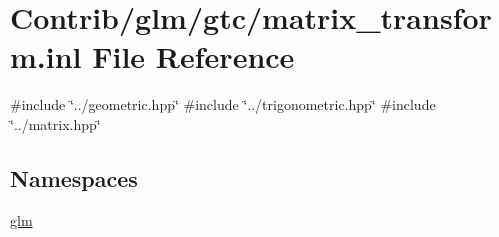\hypertarget{matrix__transform_8inl}{}\section{Contrib/glm/gtc/matrix\+\_\+transform.inl File Reference}
\label{matrix__transform_8inl}
{\ttfamily \#include \char`\"{}../geometric.\+hpp\char`\"{}}\newline
{\ttfamily \#include \char`\"{}../trigonometric.\+hpp\char`\"{}}\newline
{\ttfamily \#include \char`\"{}../matrix.\+hpp\char`\"{}}\newline
\subsection*{Namespaces}
\begin{DoxyCompactItemize}
\item 
 \mbox{\hyperlink{namespaceglm}{glm}}
\end{DoxyCompactItemize}
